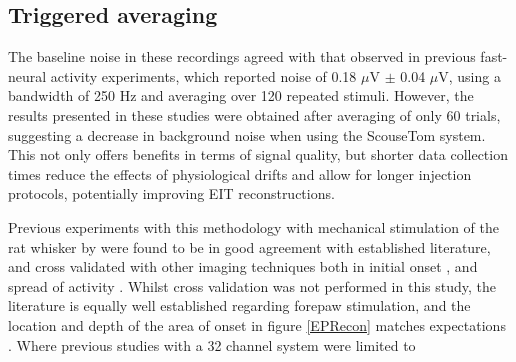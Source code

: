 \subsection{Triggered averaging}
The baseline noise in these recordings agreed with that observed in previous fast-neural activity experiments, which reported noise of 0.18 $\mu$V $\pm$ 0.04 $\mu$V, using a bandwidth of 250 Hz \cite{Oh2011,Packham2016} and averaging over 120 repeated stimuli. However, the results presented in these studies were obtained after averaging of only 60 trials, suggesting a decrease in background noise when using the ScouseTom system. This not only offers benefits in terms of signal quality, but shorter data collection times reduce the effects of physiological drifts and allow for longer injection protocols, potentially improving EIT reconstructions.  

Previous experiments with this methodology with mechanical stimulation of the rat whisker by \citet{Aristovich_2016} were found to be in good agreement with established literature, and cross validated with other imaging techniques both in initial onset \cite{armstrong1991thalamo}, and spread of activity \cite{petersen2007functional}. Whilst cross validation was not performed in this study, the literature is equally well established regarding forepaw stimulation, and the location and depth of the area of onset in figure \ref{EPRecon} matches expectations \cite{peeters2001comparing} \cite{masamoto2007relationship} \cite{lowe2007small}. Where previous studies with a 32 channel system were limited to 
